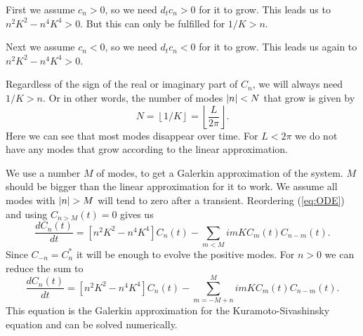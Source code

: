 First we assume $c_n > 0$, so we need $d_t c_n > 0$ for it to grow.
This leads us to $n^2 K^2 - n^4 K^4 > 0$. But this can only be fulfilled for $1/K > n$.

Next we assume $c_n < 0$, so we need $d_t c_n < 0$ for it to grow.
This leads us again to $n^2 K^2 - n^4 K^4 > 0$.

Regardless of the sign of the real or imaginary part of $C_n$, we will always need $1/K > n$. Or in other words, the number of modes $\left\vert n \right\vert < N$ that grow is given by
\begin{equation}
  N = \left \lfloor{1/K}\right \rfloor = \left \lfloor{\frac{L}{2\pi}}\right \rfloor.
\end{equation}
Here we can see that most modes disappear over time.
For $L < 2 \pi$ we do not have any modes that grow according to the linear approximation.

We use a number $M$ of modes, to get a Galerkin approximation of the system. $M$ should be bigger than the linear approximation for it to work. We assume all modes with $\left\vert n \right\vert > M$ will tend to zero after a transient. Reordering (\ref{eq:ODE}) and using $C_{n > M}(t) = 0$ gives us
\begin{equation}
    \frac{d C_n(t)}{dt} = \left[ n^2 K^2 - n^4 K^4 \right] C_n(t) - \sum_{m < M} i m K C_m(t) C_{n - m}(t).
\end{equation}
Since $C_{-n} = C_n^*$ it will be enough to evolve the positive modes. For $n > 0$ we can reduce the sum to
\begin{equation}
  \frac{d C_n(t)}{dt} = \left[ n^2 K^2 - n^4 K^4 \right] C_n(t) - \sum_{m = -M + n}^{M} i m K C_m(t) C_{n - m}(t). \label{eq:galerkin}
\end{equation}
This equation is the Galerkin approximation for the Kuramoto-Sivashinsky equation and can be solved numerically.
